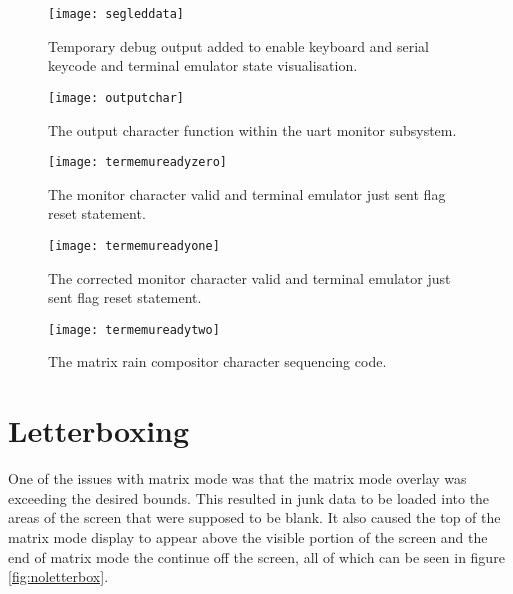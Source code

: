 \begin{figure}
  \centering
  \texttt{[image: segleddata]}
  \caption{Temporary debug output added to enable keyboard and serial keycode and terminal emulator state visualisation.}
  \label{fig:segleddata}
\end{figure}

\begin{figure}
  \centering
  \texttt{[image: outputchar]}
  \caption{The output character function within the uart monitor subsystem.}
  \label{fig:outputchar}
\end{figure}

\begin{figure}
  \centering
  \texttt{[image: termemureadyzero]}
  \caption{The monitor character valid and terminal emulator just sent flag reset statement.}
  \label{fig:termemureadyzero}
\end{figure}

\begin{figure}
  \centering
  \texttt{[image: termemureadyone]}
  \caption{The corrected monitor character valid and terminal emulator just sent flag reset statement.}
  \label{fig:termemureadyone}
\end{figure}

\begin{figure}
  \centering
  \texttt{[image: termemureadytwo]}
  \caption{The matrix rain compositor character sequencing code.}
  \label{fig:termemureadytwo}
\end{figure}


\section{Letterboxing}

\label{Ch5 Sec2}

One of the issues with matrix mode was that the matrix mode overlay was exceeding the desired bounds. This resulted in junk data to be loaded into the areas of the screen that were supposed to be blank. It also caused the top of the matrix mode display to appear above the visible portion of the screen and the end of matrix mode the continue off the screen, all of which can be seen in figure \ref{fig:noletterbox}.

